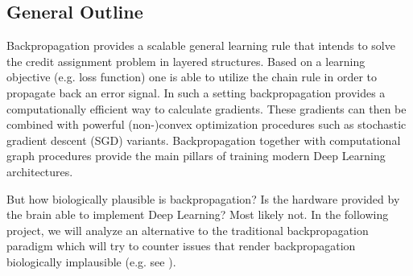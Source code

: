 \documentclass[12pt]{article}
\begin{document}
\setcounter{tocdepth}{1}


\maketitle

\subsection*{General Outline}
Backpropagation \citep{rumelhart1986} provides a scalable general learning rule that intends to solve the credit assignment problem in layered structures. Based on a learning objective (e.g. loss function) one is able to utilize the chain rule in order to propagate back an error signal. In such a setting backpropagation provides a computationally efficient way to calculate gradients. These gradients can then be combined with powerful (non-)convex optimization procedures such as stochastic gradient descent (SGD) variants. Backpropagation together with computational graph procedures provide the main pillars of training modern Deep Learning architectures. 

But how biologically plausible is backpropagation? Is the hardware provided by the brain able to implement Deep Learning? Most likely not. In the following project, we will analyze an alternative to the traditional backpropagation paradigm which will try to counter issues that render backpropagation biologically implausible (e.g. see \citet{lillicrap2016, guerguiev2017}). 
\end{document}
